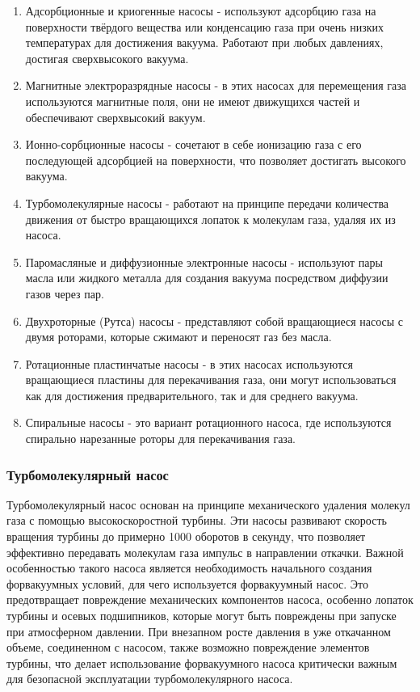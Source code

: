 \documentclass[12pt,oneside,a4paper]{article}
\begin{document}
\begin{enumerate}
    \item Адсорбционные и криогенные насосы - используют адсорбцию газа на поверхности твёрдого вещества или конденсацию газа при очень низких температурах для достижения вакуума. Работают при любых давлениях, достигая сверхвысокого вакуума.
    \item Магнитные электроразрядные насосы - в этих насосах для перемещения газа используются магнитные поля, они не имеют движущихся частей и обеспечивают сверхвысокий вакуум.
    \item Ионно-сорбционные насосы - сочетают в себе ионизацию газа с его последующей адсорбцией на поверхности, что позволяет достигать высокого вакуума.
    \item Турбомолекулярные насосы - работают на принципе передачи количества движения от быстро вращающихся лопаток к молекулам газа, удаляя их из насоса.
    \item Паромасляные и диффузионные электронные насосы - используют пары масла или жидкого металла для создания вакуума посредством диффузии газов через пар.
    \item Двухроторные (Рутса) насосы - представляют собой вращающиеся насосы с двумя роторами, которые сжимают и переносят газ без масла.
    \item Ротационные пластинчатые насосы - в этих насосах используются вращающиеся пластины для перекачивания газа, они могут использоваться как для достижения предварительного, так и для среднего вакуума.
    \item Спиральные насосы - это вариант ротационного насоса, где используются спирально нарезанные роторы для перекачивания газа.
\end{enumerate}


\subsubsection{Турбомолекулярный насос}
Турбомолекулярный насос основан на принципе механического удаления молекул газа с помощью высокоскоростной турбины. Эти насосы развивают скорость вращения турбины до примерно 1000 оборотов в секунду, что позволяет эффективно передавать молекулам газа импульс в направлении откачки. Важной особенностью такого насоса является необходимость начального создания форвакуумных условий, для чего используется форвакуумный насос. Это предотвращает повреждение механических компонентов насоса, особенно лопаток турбины и осевых подшипников, которые могут быть повреждены при запуске при атмосферном давлении. При внезапном росте давления в уже откачанном объеме, соединенном с насосом, также возможно повреждение элементов турбины, что делает использование форвакуумного насоса критически важным для безопасной эксплуатации турбомолекулярного насоса.
\end{document}
